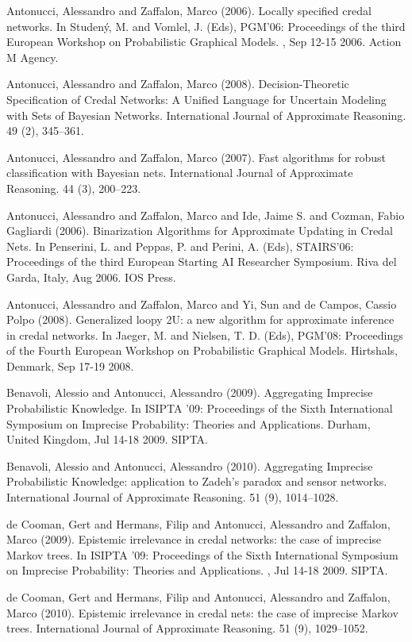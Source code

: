 \begin{cventries}
\begin{cvitems}
\item Antonucci, Alessandro and Zaffalon, Marco (2006).   Locally specified credal networks.   In Studený, M. and Vomlel, J. (Eds), PGM’06: Proceedings of the third European Workshop on Probabilistic Graphical Models.   ,   Sep 12-15 2006.   Action M Agency.
\item Antonucci, Alessandro and Zaffalon, Marco (2008).   Decision-Theoretic Specification of Credal Networks: A Unified Language for Uncertain Modeling with Sets of Bayesian Networks.   International Journal of Approximate Reasoning. 49 (2), 345–361.
\item Antonucci, Alessandro and Zaffalon, Marco (2007).   Fast algorithms for robust classification with Bayesian nets.   International Journal of Approximate Reasoning. 44 (3), 200–223.
\item Antonucci, Alessandro and Zaffalon, Marco and Ide, Jaime S. and Cozman, Fabio Gagliardi (2006).   Binarization Algorithms for Approximate Updating in Credal Nets.   In Penserini, L. and Peppas, P. and Perini, A. (Eds), STAIRS’06: Proceedings of the third European Starting AI Researcher Symposium.   Riva del Garda, Italy,   Aug 2006.   IOS Press.
\item Antonucci, Alessandro and Zaffalon, Marco and Yi, Sun and de Campos, Cassio Polpo (2008).   Generalized loopy 2U: a new algorithm for approximate inference in credal networks.   In Jaeger, M. and Nielsen, T. D. (Eds), PGM’08: Proceedings of the Fourth European Workshop on Probabilistic Graphical Models.   Hirtshals, Denmark,   Sep 17-19 2008.
\item Benavoli, Alessio and Antonucci, Alessandro (2009).   Aggregating Imprecise Probabilistic Knowledge.   In ISIPTA ’09: Proceedings of the Sixth International Symposium on Imprecise Probability: Theories and Applications.   Durham, United Kingdom,   Jul 14-18 2009.   SIPTA.
\item Benavoli, Alessio and Antonucci, Alessandro (2010).   Aggregating Imprecise Probabilistic Knowledge: application to Zadeh’s paradox and sensor networks.   International Journal of Approximate Reasoning. 51 (9), 1014–1028.
\item de Cooman, Gert and Hermans, Filip and Antonucci, Alessandro and Zaffalon, Marco (2009).   Epistemic irrelevance in credal networks: the case of imprecise Markov trees.   In ISIPTA ’09: Proceedings of the Sixth International Symposium on Imprecise Probability: Theories and Applications.   ,   Jul 14-18 2009.   SIPTA.
\item de Cooman, Gert and Hermans, Filip and Antonucci, Alessandro and Zaffalon, Marco (2010).   Epistemic irrelevance in credal nets: the case of imprecise Markov trees.   International Journal of Approximate Reasoning. 51 (9), 1029–1052.

\end{cvitems}
\end{cventries}
